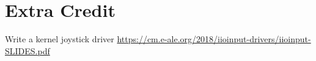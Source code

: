\section{Extra Credit}

\begin{frame}
   {Write a kernel joystick driver}
	\url{https://cm.e-ale.org/2018/iioinput-drivers/iioinput-SLIDES.pdf}
\end{frame}
